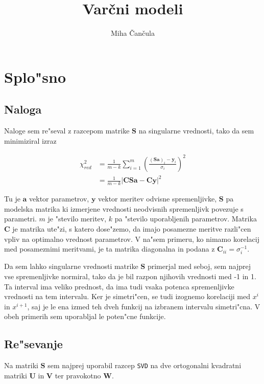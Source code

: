 \documentclass[a4paper,10pt]{article}
\title{Var\v cni modeli}
\author{Miha \v Can\v cula}
\begin{document}
\maketitle

\section{Splo"sno}

\subsection{Naloga}

Naloge sem re"seval z razcepom matrike $\mathbf{S}$ na singularne vrednosti, tako da sem minimiziral izraz 

\begin{align}
 \chi^2_{red} &= \frac{1}{m-k} \sum_{i=1}^m \left(\frac{(\mathbf{Sa})_i - \mathbf{y}_i}{\sigma_i}\right)^2 \\
  &= \frac{1}{m-k} \left|\mathbf{CSa} - \mathbf{Cy}\right|^2
\end{align}

Tu je $\mathbf{a}$ vektor parametrov, $\mathbf{y}$ vektor meritev odvisne spremenljivke, $\mathbf{S}$ pa modelska matrika ki izmerjene vrednosti neodvisnih spremenljivk povezuje s parametri. $m$ je "stevilo meritev, $k$ pa "stevilo uporabljenih parametrov. Matrika $\mathbf{C}$ je matrika ute"zi, s katero dose"zemo, da imajo posamezne meritve razli"cen vpliv na optimalno vrednost parametrov. V na"sem primeru, ko nimamo korelacij med posameznimi meritvami, je ta matrika diagonalna in podana z $\mathbf{C}_{ii} = \sigma_i^{-1}$. 

Da sem lahko singularne vrednosti matrike $\mathbf{S}$ primerjal med seboj, sem najprej vse spremenljivke normiral, tako da je bil razpon njihovih vrednosti med -1 in 1. Ta interval ima veliko prednost, da ima tudi vsaka potenca spremenljivke vrednosti na tem intervalu. Ker je simetri"cen, se tudi izognemo korelaciji med $x^i$ in $x^{i+1}$, saj je le ena izmed teh dveh funkcij na izbranem intervalu simetri"cna. V obeh primerih sem uporabljal le poten"cne funkcije. 

\subsection{Re"sevanje}

Na matriki $\mathbf{S}$ sem najprej uporabil razcep \texttt{SVD} na dve ortogonalni kvadratni matriki $\mathbf{U}$ in $\mathbf{V}$ ter pravokotno $\mathbf{W}$. 
\end{document}
